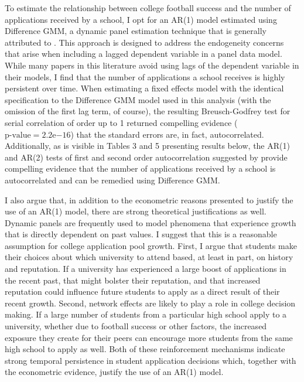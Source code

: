 \documentclass[12pt,english]{article}
\begin{document}
To estimate the relationship between college football success and the number of applications received by a school, I opt for an AR(1) model estimated using Difference GMM, a dynamic panel estimation technique that is generally attributed to \citet{arellano_bond}. This approach is designed to address the endogeneity concerns that arise when including a lagged dependent variable in a panel data model. While many papers in this literature avoid using lags of the dependent variable in their models, I find that the number of applications a school receives is highly persistent over time. When estimating a fixed effects model with the identical specification to the Difference GMM model used in this analysis (with the omission of the first lag term, of course), the resulting Breusch-Godfrey test for serial correlation of order up to 1 returned compelling evidence ($\text{p-value}=2.2\mathrm{e}{-16}$) that the standard errors are, in fact, autocorrelated. Additionally, as is visible in Tables 3 and 5 presenting results below, the AR(1) and AR(2) tests of first and second order autocorrelation suggested by \citet{arellano_bond} provide compelling evidence that the number of applications received by a school is autocorrelated and can be remedied using Difference GMM.

I also argue that, in addition to the econometric reasons presented to justify the use of an AR(1) model, there are strong theoretical justifications as well. Dynamic panels are frequently used to model phenomena that experience growth that is directly dependent on past values. I suggest that this is a reasonable assumption for college application pool growth. First, I argue that students make their choices about which university to attend based, at least in part, on history and reputation. If a university has experienced a large boost of applications in the recent past, that might bolster their reputation, and that increased reputation could influence future students to apply as a direct result of their recent growth. Second, network effects are likely to play a role in college decision making. If a large number of students from a particular high school apply to a university, whether due to football success or other factors, the increased exposure they create for their peers can encourage more students from the same high school to apply as well. Both of these reinforcement mechanisms indicate strong temporal persistence in student application decisions which, together with the econometric evidence, justify the use of an AR(1) model. 
\end{document}

